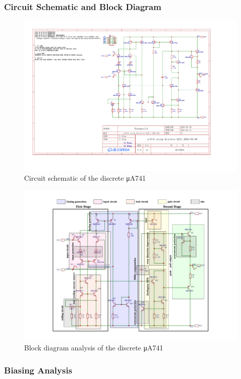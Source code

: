 \documentclass[UTF8]{article}
\begin{document}
\subsubsection{Circuit Schematic and Block Diagram}
\vspace*{-6mm}
\begin{figure}[H]\centering
    \includegraphics[width=0.79\columnwidth]{LCE-06-07-运放设计/assets/uA741/SCH_Schematic1_1-P1_2025-05-15.pdf}
    \caption{Circuit schematic of the discrete μA741}
\end{figure}
\begin{figure}[H]\centering
    \includegraphics[width=0.79\columnwidth]{assets/uA741/uA741 block.pdf}
    \caption{Block diagram analysis of the discrete μA741}
\end{figure}

\subsubsection{Biasing Analysis}
\end{document}
